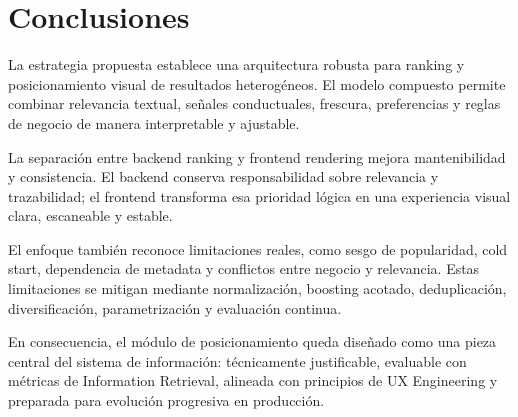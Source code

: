 \documentclass[12pt,a4paper]{article}
\begin{document}
\section{Conclusiones}

La estrategia propuesta establece una arquitectura robusta para ranking y posicionamiento visual de resultados heterogéneos. El modelo compuesto permite combinar relevancia textual, señales conductuales, frescura, preferencias y reglas de negocio de manera interpretable y ajustable.

La separación entre backend ranking y frontend rendering mejora mantenibilidad y consistencia. El backend conserva responsabilidad sobre relevancia y trazabilidad; el frontend transforma esa prioridad lógica en una experiencia visual clara, escaneable y estable.

El enfoque también reconoce limitaciones reales, como sesgo de popularidad, cold start, dependencia de metadata y conflictos entre negocio y relevancia. Estas limitaciones se mitigan mediante normalización, boosting acotado, deduplicación, diversificación, parametrización y evaluación continua.

En consecuencia, el módulo de posicionamiento queda diseñado como una pieza central del sistema de información: técnicamente justificable, evaluable con métricas de Information Retrieval, alineada con principios de UX Engineering y preparada para evolución progresiva en producción.
\end{document}
